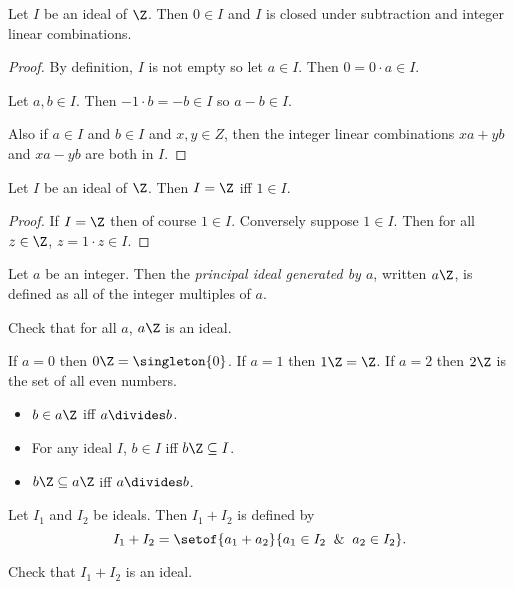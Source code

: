 \documentclass[oneside,12pt]{amsart}
\begin{document}
\begin{lemma}
Let $I$ be an ideal of $\Z$. Then $0\in I$ and $I$ is closed under subtraction
and integer linear combinations.
\end{lemma}
\begin{proof}
By definition, $I$ is not empty so let $a\in I$. Then $0=0\cdot a \in I$.

Let $a,b\in I$. Then $-1\cdot b = -b \in I$ so $a-b\in I$.

Also if $a\in I$ and $b\in I$ and $x,y\in Z$, then the integer linear
combinations $xa+yb$ and $xa-yb$ are both in $I$.
\end{proof}

\begin{lemma}
Let $I$ be an ideal of $\Z$. Then $I=\Z$ iff $1\in I$.
\end{lemma}
\begin{proof}
If $I=\Z$ then of course $1\in I$. Conversely suppose $1\in I$. Then for
all $z\in\Z$, $z=1\cdot z \in I$.
\end{proof}

\begin{definition}
Let $a$ be an integer. Then the \emph{principal ideal generated by $a$},
written $a\Z$, is defined as all of the integer multiples of $a$.
\end{definition}

Check that for all $a$, $a\Z$ is an ideal.

\begin{example}
If $a=0$ then $0\Z=\singleton{0}$. If $a=1$ then $1\Z = \Z$.
If $a=2$ then $2\Z$ is the set of all even numbers.
\end{example}

\begin{homework}
\begin{itemize}
\item $b\in a\Z$ iff $a\divides b$.
\item For any ideal $I$, $b\in I$ iff $b\Z \subseteq I$.
\item $b\Z\subseteq a\Z$ iff $a \divides b$.
\end{itemize}
\end{homework}

\begin{definition}
Let $I_1$ and $I_2$ be ideals. Then $I_1+I_2$ is defined by
$$I_1+I_2 = \setof{a_1+a_2}{a_1\in I_2\And a_2 \in I_2}.$$
\end{definition}

Check that $I_1 + I_2$ is an ideal.
\end{document}
